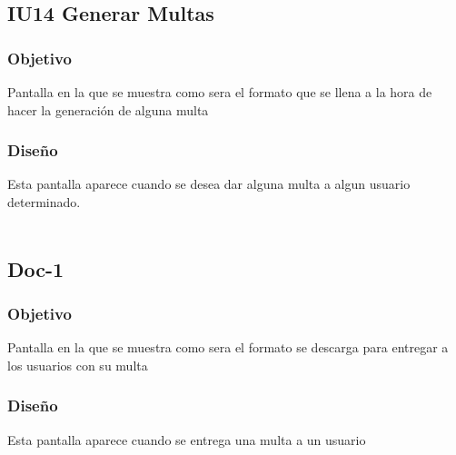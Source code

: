\newpage
\subsection{IU14 Generar Multas}

\subsubsection{Objetivo}
	Pantalla en la que se muestra como sera el formato que se llena a la hora de hacer la generación de alguna multa  

\subsubsection{Diseño}
	Esta pantalla aparece cuando se desea dar alguna multa a algun usuario determinado.  \\\\
	

\subsection{Doc-1}

\subsubsection{Objetivo}
	Pantalla en la que se muestra como sera el formato se descarga para entregar a los usuarios con su multa

\subsubsection{Diseño}
	Esta pantalla aparece cuando se entrega una multa a un usuario  \\\\
	

